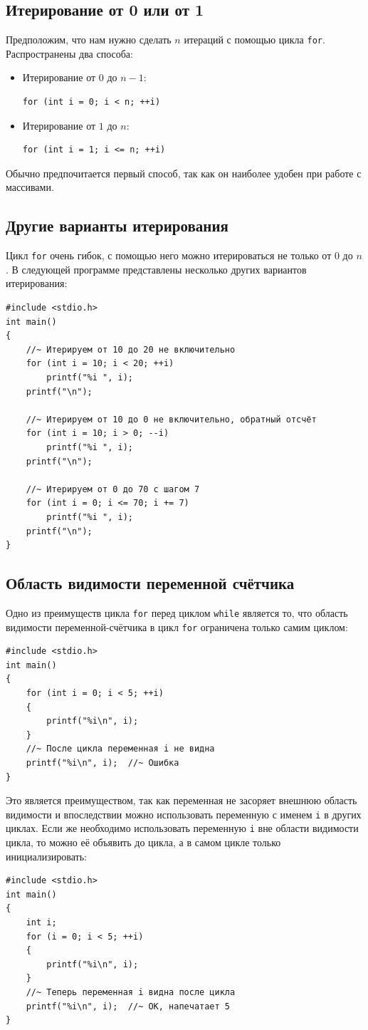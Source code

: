 \documentclass{article}
\begin{document}
\subsection*{Итерирование от 0 или от 1}
Предположим, что нам нужно сделать $n$ итераций с помощью цикла \texttt{for}. Распространены два способа:
\begin{itemize}
\item Итерирование от $0$ до $n - 1$:
\begin{lstlisting}
for (int i = 0; i < n; ++i)
\end{lstlisting}

\item Итерирование от $1$ до $n$:
\begin{lstlisting}
for (int i = 1; i <= n; ++i)
\end{lstlisting}
\end{itemize}
Обычно предпочитается первый способ, так как он наиболее удобен при работе с массивами.

\subsection*{Другие варианты итерирования}
Цикл \texttt{for} очень гибок, с помощью него можно итерироваться не только от $0$ до $n$. В следующей программе представлены несколько других вариантов итерирования:
\begin{lstlisting}
#include <stdio.h>
int main()
{
	//~ Итерируем от 10 до 20 не включительно
	for (int i = 10; i < 20; ++i)
		printf("%i ", i);
	printf("\n");
	
	//~ Итерируем от 10 до 0 не включительно, обратный отсчёт
	for (int i = 10; i > 0; --i)
		printf("%i ", i);
	printf("\n");	
	
	//~ Итерируем от 0 до 70 с шагом 7
	for (int i = 0; i <= 70; i += 7)
		printf("%i ", i);
	printf("\n");	
}
\end{lstlisting}


\subsection*{Область видимости переменной счётчика}
Одно из преимуществ цикла \texttt{for} перед циклом \texttt{while} является то, что область видимости переменной-счётчика в цикл \texttt{for} ограничена только самим циклом:
\begin{lstlisting}
#include <stdio.h>
int main()
{
	for (int i = 0; i < 5; ++i)
	{
		printf("%i\n", i);
	}
	//~ После цикла переменная i не видна
	printf("%i\n", i);  //~ Ошибка
}
\end{lstlisting}
Это является преимуществом, так как переменная не засоряет внешнюю область видимости и впоследствии можно использовать переменную с именем \texttt{i} в других циклах. Если же необходимо использовать переменную \texttt{i} вне области видимости цикла, то можно её объявить до цикла, а в самом цикле только инициализировать:
\begin{lstlisting}
#include <stdio.h>
int main()
{
	int i;
	for (i = 0; i < 5; ++i)
	{
		printf("%i\n", i);
	}
	//~ Теперь переменная i видна после цикла
	printf("%i\n", i);  //~ ОК, напечатает 5
}	
\end{lstlisting}
\end{document}
